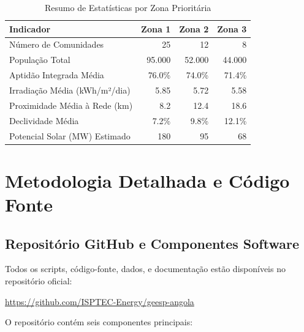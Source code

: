 \documentclass[12pt, a4paper]{article}
\begin{document}
\begin{table}[H]
\centering
\caption{Resumo de Estatísticas por Zona Prioritária}
\label{Tab:12}

\small
\begin{tabular}{lrrr}
\toprule
\rowcolor{LightBlue}\textbf{Indicador} & \textbf{Zona 1} & \textbf{Zona 2} & \textbf{Zona 3} \\
\midrule
Número de Comunidades & 25 & 12 & 8 \\
População Total & 95.000 & 52.000 & 44.000 \\
Aptidão Integrada Média & 76.0\% & 74.0\% & 71.4\% \\
Irradiação Média (kWh/m²/dia) & 5.85 & 5.72 & 5.58 \\
Proximidade Média à Rede (km) & 8.2 & 12.4 & 18.6 \\
Declividade Média & 7.2\% & 9.8\% & 12.1\% \\
Potencial Solar (MW) Estimado & 180 & 95 & 68 \\
\bottomrule
\end{tabular}
\end{table}

\section{Metodologia Detalhada e Código Fonte}

\subsection{Repositório GitHub e Componentes Software}

Todos os scripts, código-fonte, dados, e documentação estão disponíveis no repositório oficial:

\begin{center}
\url{https://github.com/ISPTEC-Energy/geesp-angola}
\end{center}

O repositório contém seis componentes principais:
\end{document}
